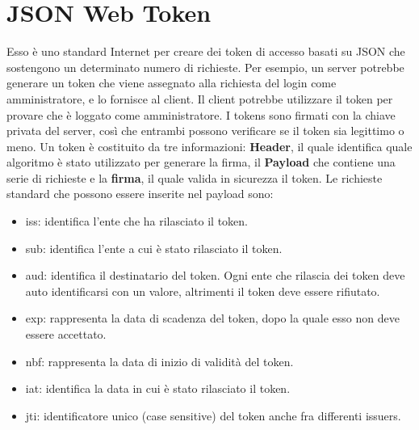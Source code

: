 \section{JSON Web Token}
Esso è uno standard Internet per creare dei token di accesso basati su JSON che sostengono un determinato numero di richieste. Per esempio, un server potrebbe generare un token che viene assegnato alla richiesta del login come amministratore, e lo fornisce al client. Il client potrebbe utilizzare il token per provare che è loggato come amministratore. I tokens sono firmati con la chiave privata del server, così che entrambi possono verificare se il token sia legittimo o meno. Un token è costituito da tre informazioni: \textbf{Header}, il quale identifica quale algoritmo è stato utilizzato per generare la firma, il \textbf{Payload} che contiene una serie di richieste e la \textbf{firma}, il quale valida in sicurezza il token. Le richieste standard che possono essere inserite nel payload sono:
\begin{itemize}
\item iss: identifica l'ente che ha rilasciato il token.
\item sub: identifica l'ente a cui è stato rilasciato il token.
\item aud: identifica il destinatario del token. Ogni ente che rilascia dei token deve auto identificarsi con un valore, altrimenti il token deve essere rifiutato.
\item exp: rappresenta la data di scadenza del token, dopo la quale esso non deve essere accettato.
\item nbf: rappresenta la data di inizio di validità del token.
\item iat: identifica la data in cui è stato rilasciato il token.
\item jti: identificatore unico (case sensitive) del token anche fra differenti issuers.
\end{itemize}
